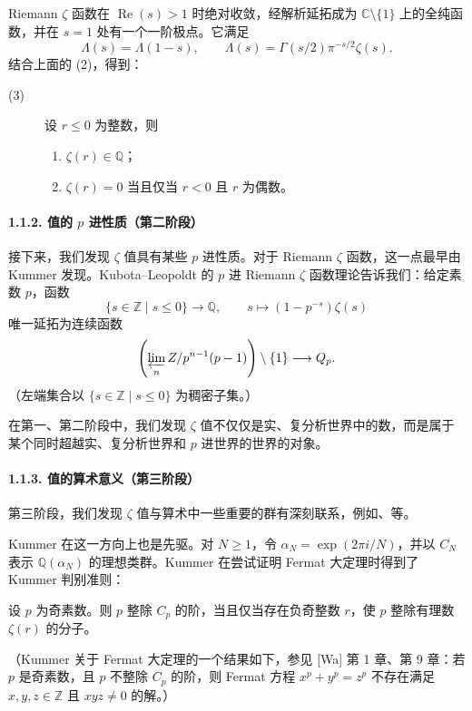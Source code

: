 Riemann $\zeta$ 函数在 $\operatorname{Re}(s)>1$ 时绝对收敛，经解析延拓成为 $\mathbb C\setminus\{1\}$ 上的全纯函数，并在 $s=1$ 处有一个一阶极点。它满足
\[
\Lambda(s)=\Lambda(1-s),\qquad
\Lambda(s)=\Gamma(s/2)\pi^{-s/2}\zeta(s).
\]
结合上面的 (2)，得到：
\begin{description}
\item[(3)] 设 $r\leq0$ 为整数，则
\begin{enumerate}[label=(\roman*)]
\item $\zeta(r)\in\mathbb Q$；
\item $\zeta(r)=0$ 当且仅当 $r<0$ 且 $r$ 为偶数。
\end{enumerate}
\end{description}

\paragraph{1.1.2. 值的 $p$ 进性质（第二阶段）}
接下来，我们发现 $\zeta$ 值具有某些 $p$ 进性质。对于 Riemann $\zeta$ 函数，这一点最早由 Kummer 发现。Kubota--Leopoldt 的 $p$ 进 Riemann $\zeta$ 函数理论告诉我们：给定素数 $p$，函数
\[
\{s\in\mathbb Z\mid s\leq0\}\longrightarrow\mathbb Q,
\qquad s\longmapsto(1-p^{-s})\zeta(s)
\]
唯一延拓为连续函数
\[
\left(\varprojlim_n\mathbb Z/p^{n-1}(p-1)\right)\setminus\{1\}
\longrightarrow\mathbb Q_p.
\]
（左端集合以 $\{s\in\mathbb Z\mid s\leq0\}$ 为稠密子集。）

在第一、第二阶段中，我们发现 $\zeta$ 值不仅仅是实、复分析世界中的数，而是属于某个同时超越实、复分析世界和 $p$ 进世界的世界的对象。

\paragraph{1.1.3. 值的算术意义（第三阶段）}
第三阶段，我们发现 $\zeta$ 值与算术中一些重要的群有深刻联系，例如、等。

Kummer 在这一方向上也是先驱。对 $N\geq1$，令 $\alpha_N=\exp(2\pi i/N)$，并以 $C_N$ 表示 $\mathbb Q(\alpha_N)$ 的理想类群。Kummer 在尝试证明 Fermat 大定理时得到了 Kummer 判别准则：

设 $p$ 为奇素数。则 $p$ 整除 $C_p$ 的阶，当且仅当存在负奇整数 $r$，使 $p$ 整除有理数 $\zeta(r)$ 的分子。

（Kummer 关于 Fermat 大定理的一个结果如下，参见 [Wa] 第 1 章、第 9 章：若 $p$ 是奇素数，且 $p$ 不整除 $C_p$ 的阶，则 Fermat 方程 $x^p+y^p=z^p$ 不存在满足 $x,y,z\in\mathbb Z$ 且 $xyz\ne0$ 的解。）

